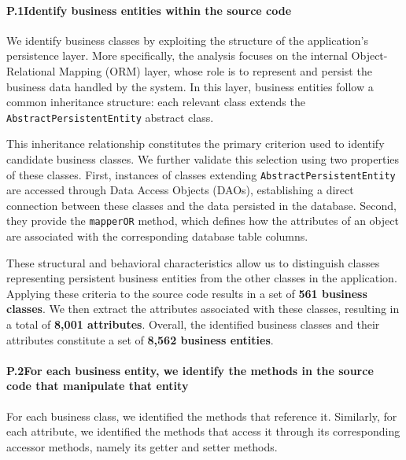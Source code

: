 \vspace{-0.5em}

\paragraph{P.1\quad Identify business entities within the source code}\noindent

We identify business classes by exploiting the structure of the application's persistence layer. More specifically, the analysis focuses on the internal Object-Relational Mapping (ORM) layer, whose role is to represent and persist the business data handled by the system. In this layer, business entities follow a common inheritance structure: each relevant class extends the \texttt{AbstractPersistentEntity} abstract class.

This inheritance relationship constitutes the primary criterion used to identify candidate business classes. We further validate this selection using two properties of these classes. First, instances of classes extending \texttt{AbstractPersistentEntity} are accessed through Data Access Objects (DAOs), establishing a direct connection between these classes and the data persisted in the database. Second, they provide the \texttt{mapperOR} method, which defines how the attributes of an object are associated with the corresponding database table columns.

These structural and behavioral characteristics allow us to distinguish classes representing persistent business entities from the other classes in the application. Applying these criteria to the source code results in a set of \textbf{561 business classes}. We then extract the attributes associated with these classes, resulting in a total of \textbf{8,001 attributes}. Overall, the identified business classes and their attributes constitute a set of \textbf{8,562 business entities}.

\paragraph{P.2\quad For each business entity, we identify the methods in the source code that manipulate that entity}\noindent

\vspace{-0.1em}

For each business class, we identified the methods that reference it. Similarly, for each attribute, we identified the methods that access it through its corresponding accessor methods, namely its getter and setter methods.


